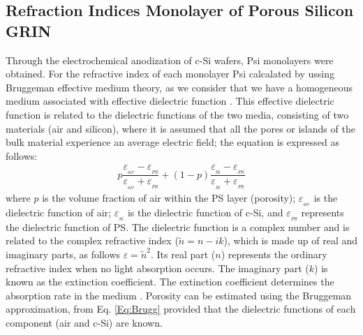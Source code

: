 \documentclass{article}
\begin{document}
 \subsection{Refraction Indices Monolayer of Porous Silicon GRIN }
Through the electrochemical anodization of c-Si wafers, Psi monolayers
were obtained. For the refractive index of each monolayer Psi
calcalated by ussing  Bruggeman effective medium theory, as we
consider that we have a homogeneous medium associated with effective
dielectric function \cite{I20}. This effective dielectric function is
related to the dielectric functions of the two media, consisting of
two materials (air and silicon), where it is assumed that all the
pores or islands of the bulk material experience an average electric
field; the equation is expressed as follows:
 \begin{eqnarray}\label{Eq:Brugg}
 p\dfrac{\varepsilon_{_{air}}-\varepsilon_{_{PS}}}{\varepsilon_{_{air}}+\varepsilon_{_{PS}}}+(1-p)\dfrac{\varepsilon_{_{Si}}-\varepsilon_{_{PS}}}{\varepsilon_{_{Si}}+
   \varepsilon_{_{PS}}}
 \end{eqnarray}
 where $ p $ is the volume fraction of air within the PS layer
 (porosity); $\varepsilon_{_{air}}$ is the dielectric function of air;
 $\varepsilon_{_{Si}}$ is the dielectric function of c-Si, and
 $\varepsilon_{_{PS}}$ represents the dielectric function of PS. The
 dielectric function is a complex number and is related to the complex
 refractive index ($\tilde{n} = n - ik$), which is made up of real and
 imaginary parts, as follows $\varepsilon=\tilde{n}^2$. Its real part
 ($ n $) represents the ordinary refractive index when no light
 absorption occurs. The imaginary part ($ k $) is known as the
 extinction coefficient. The extinction coefficient determines the
 absorption rate in the medium \cite{I21}. Porosity can be estimated
 using the Bruggeman approximation, from Eq. \ref{Eq:Brugg} provided
 that the dielectric functions of each component (air and c-Si) are
 known.
\end{document}
